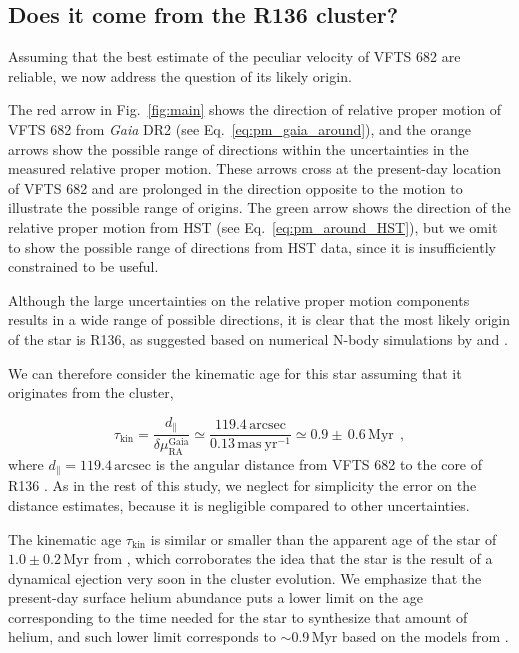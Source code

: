 \documentclass[apjl,twocolumn]{emulateapj}
\DeclareRobustCommand{\Eqref}[1]{Eq.~\ref{#1}}
\DeclareRobustCommand{\Figref}[1]{Fig.~\ref{#1}}
\begin{document}
\subsection{Does it come from the R136 cluster?}
\label{sec:r136_origin}

Assuming that the best estimate of the peculiar velocity of VFTS 682
are reliable, we now address the question of its likely origin.

The red arrow in \Figref{fig:main} shows the direction of relative proper motion of
VFTS 682 from \emph{Gaia} DR2 (see \Eqref{eq:pm_gaia_around}), and the orange arrows show the possible
range of directions within the uncertainties in the measured relative proper
motion. These arrows cross at the present-day location of VFTS 682 and
are prolonged in the direction opposite to the motion to illustrate
the possible range of origins. The green arrow shows the direction of
the relative proper motion from HST (see \Eqref{eq:pm_around_HST}),
but we omit to show the possible range of directions from HST data, since it is
insufficiently constrained to be useful.

Although the large uncertainties on the relative proper motion
components results in a wide range of possible directions, it is clear that the most likely origin of the star is R136,
as suggested based on numerical N-body simulations by \cite{fujii:11}
and \cite{banerjee:12}.

We can therefore consider the kinematic age for this star assuming
that it originates from the cluster,

\begin{equation}
  \label{eq:kin_age}
  \tau_\mathrm{kin} = \frac{d_\parallel}{\delta\mu_\mathrm{RA}^\mathrm{Gaia}} \simeq
  \frac{119.4\,\mathrm{arcsec}}{0.13\,\mathrm{mas\ yr^{-1}}} \simeq 0.9\pm\,0.6\, \mathrm{Myr} \ \ ,
\end{equation}
where $d_\parallel = 119.4\,\mathrm{arcsec}$ is the angular distance from VFTS 682 to
the core of R136 \citep[corresponding to $\sim$29\,pc at LMC distance,][]{bestenlehner:11}.
As in the rest of this study, we neglect for
simplicity the error on the distance estimates, because it is negligible compared to other uncertainties.

The kinematic age $\tau_\mathrm{kin}$ is similar or smaller than the apparent age
of the star of $1.0\pm 0.2$\,Myr from \cite{schneider:18}, which
corroborates the idea that the star is the result of a dynamical
ejection very soon in the cluster evolution. We emphasize that the
present-day surface helium abundance
\citep[$Y\simeq0.5$,][]{bestenlehner:11, rubio-diez:17} puts a lower
limit on the age corresponding to the time needed for the star to
synthesize that amount of helium, and such lower limit corresponds to
$\sim$0.9\,Myr based on the models from \cite{kohler:15}.
\end{document}
